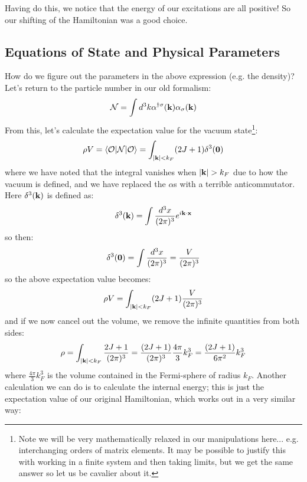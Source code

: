 Having do this, we notice that the energy of our excitations are all positive! So our shifting of the Hamiltonian was a good choice.

\subsection{Equations of State and Physical Parameters}
How do we figure out the parameters in the above expression (e.g. the density)? Let's return to the particle number in our old formalism:
\begin{equation}
    \mathcal{N} = \int d^3k \alpha^{\dagger\sigma}(\mathbf{k})\alpha_\sigma(\mathbf{k})
\end{equation}
From this, let's calculate the expectation value for the vacuum state\footnote{Note we will be very mathematically relaxed in our manipulations here... e.g. interchanging orders of matrix elements. It may be possible to justify this with working in a finite system and then taking limits, but we get the same answer so let us be cavalier about it.}:
\begin{equation}
    \rho V = \langle \mathcal{O} \rvert\mathcal{N}\lvert \mathcal{O} \rangle = \int_{\lvert \mathbf{k} \rvert < k_F}(2J + 1)\delta^3(\mathbf{0})
\end{equation}
where we have noted that the integral vanishes when $\lvert \mathbf{k} \rvert > k_F$ due to how the vacuum is defined, and we have replaced the $\alpha$s with a terrible anticommutator. Here $\delta^3(\mathbf{k})$ is defined as:
\begin{equation}
    \delta^3(\mathbf{k}) = \int \frac{d^3x}{(2\pi)^3}e^{i\mathbf{k} \cdot \mathbf{x}}
\end{equation}
so then:
\begin{equation}
    \delta^3(\mathbf{0}) = \int \frac{d^3x}{(2\pi)^3} = \frac{V}{(2\pi)^3} 
\end{equation}
so the above expectation value becomes:
\begin{equation}
    \rho V = \int_{\lvert \mathbf{k} \rvert < k_F}(2J + 1)\frac{V}{(2\pi)^3} 
\end{equation}
and if we now cancel out the volume, we remove the infinite quantities from both sides:
\begin{equation}\label{eq-rho}
    \rho = \int_{\lvert \mathbf{k} \rvert < k_F}\frac{2J + 1}{(2\pi)^3} = \frac{(2J+1)}{(2\pi)^3} \frac{4\pi}{3}k_F^3 = \frac{(2J+1)}{6\pi^2}k_F^3
\end{equation}
where $\frac{4\pi}{3}k_F^3$ is the volume contained in the Fermi-sphere of radius $k_F$. Another calculation we can do is to calculate the internal energy; this is just the expectation value of our original Hamiltonian, which works out in a very similar way:
